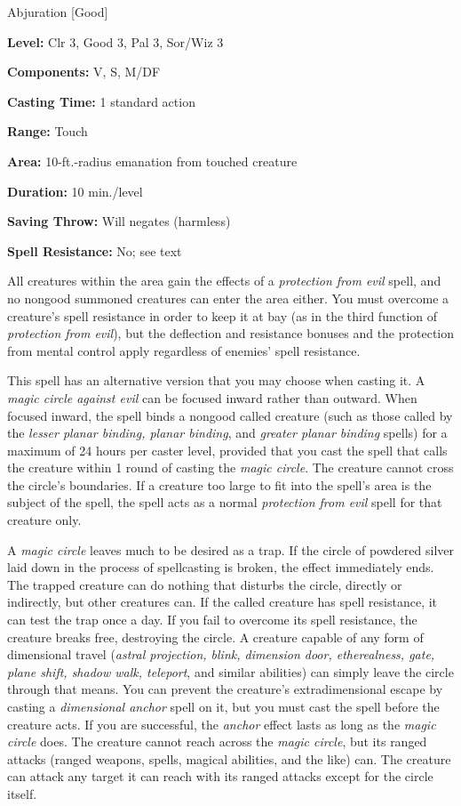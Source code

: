 
Abjuration [Good]

\textbf{Level:} Clr 3, Good 3, Pal 3, Sor/Wiz 3

\textbf{Components:} V, S, M/DF

\textbf{Casting Time:} 1 standard action

\textbf{Range:} Touch

\textbf{Area:} 10-ft.-radius emanation from touched creature

\textbf{Duration:} 10 min./level

\textbf{Saving Throw:} Will negates (harmless)

\textbf{Spell Resistance:} No; see text

All creatures within the area gain the effects of a \textit{protection from evil 
}spell, and no nongood summoned creatures can enter the area either. You must overcome 
a creature's spell resistance in order to keep it at bay (as in the third function 
of \textit{protection from evil}), but the deflection and resistance bonuses and 
the protection from mental control apply regardless of enemies' spell resistance.

This spell has an alternative version that you may choose when casting it. A \textit{magic 
circle against evil} can be focused inward rather than outward. When focused inward, 
the spell binds a nongood called creature (such as those called by the \textit{lesser 
planar binding, planar binding}, and \textit{greater planar binding} spells) for 
a maximum of 24 hours per caster level, provided that you cast the spell that calls 
the creature within 1 round of casting the \textit{magic circle}. The creature 
cannot cross the circle's boundaries. If a creature too large to fit into the spell's 
area is the subject of the spell, the spell acts as a normal \textit{protection 
from evil} spell for that creature only.

A \textit{magic circle} leaves much to be desired as a trap. If the circle of powdered 
silver laid down in the process of spellcasting is broken, the effect immediately 
ends. The trapped creature can do nothing that disturbs the circle, directly or 
indirectly, but other creatures can. If the called creature has spell resistance, 
it can test the trap once a day. If you fail to overcome its spell resistance, 
the creature breaks free, destroying the circle. A creature capable of any form 
of dimensional travel (\textit{astral projection, blink, dimension door, etherealness, 
gate, plane shift, shadow walk, teleport}, and similar abilities) can simply leave 
the circle through that means. You can prevent the creature's extradimensional 
escape by casting a \textit{dimensional anchor} spell on it, but you must cast 
the spell before the creature acts. If you are successful, the \textit{anchor} effect 
lasts as long as the \textit{magic circle} does. The creature cannot reach across 
the \textit{magic circle}, but its ranged attacks (ranged weapons, spells, magical 
abilities, and the like) can. The creature can attack any target it can reach with 
its ranged attacks except for the circle itself.

